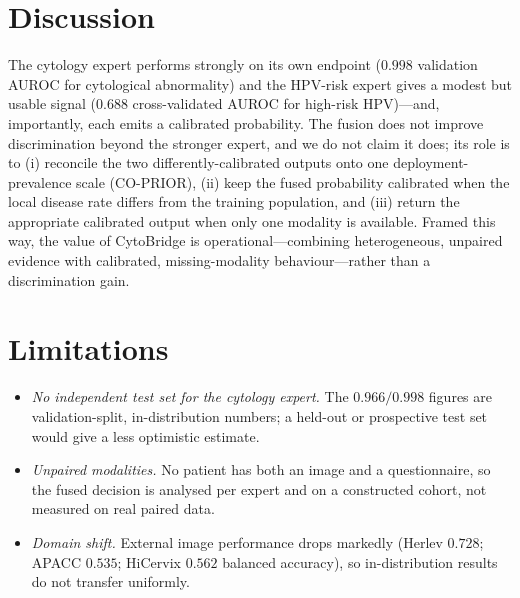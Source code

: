 \documentclass[sigplan,nonacm,screen]{acmart}
\begin{document}
\section{Discussion}
The cytology expert performs strongly on its own endpoint ($0.998$ validation AUROC for cytological
abnormality) and the HPV-risk expert gives a modest but usable signal ($0.688$ cross-validated AUROC for
high-risk HPV)---and, importantly, each emits a calibrated probability. The fusion does not improve discrimination beyond the stronger expert, and we do not claim it
does; its role is to (i) reconcile the two differently-calibrated outputs onto one deployment-prevalence scale
(CO-PRIOR), (ii) keep the fused probability calibrated when the local disease rate differs from the training
population, and (iii) return the appropriate calibrated output when only one modality is available. Framed this
way, the value of CytoBridge is operational---combining heterogeneous, unpaired evidence with calibrated,
missing-modality behaviour---rather than a discrimination gain.

\section{Limitations}\label{sec:limits}
\begin{itemize}
  \item \emph{No independent test set for the cytology expert.} The $0.966/0.998$ figures are validation-split,
    in-distribution numbers; a held-out or prospective test set would give a less optimistic estimate.
  \item \emph{Unpaired modalities.} No patient has both an image and a questionnaire, so the fused decision is
    analysed per expert and on a constructed cohort, not measured on real paired data.
  \item \emph{Domain shift.} External image performance drops markedly (Herlev $0.728$; APACC $0.535$;
    HiCervix $0.562$ balanced accuracy), so in-distribution results do not transfer uniformly.
\end{itemize}

\end{document}
